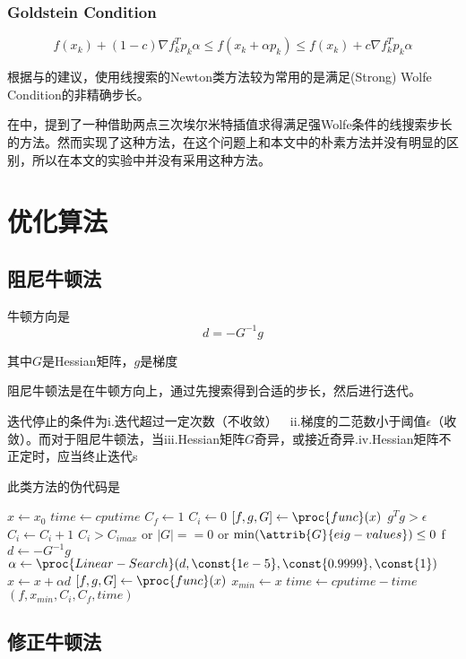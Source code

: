 \documentclass[11pt, a4paper]{article}
\begin{document}
\subsubsection{Goldstein Condition}
\[f(x_k)+(1-c)\nabla f_k^Tp_k\alpha \le f(x_k+\alpha p_k)\le f(x_k)+c\nabla f_k^T p_k\alpha\]


根据\cite{shanno1970conditioning}与\cite{ZHANG2001269}的建议，使用线搜索的Newton类方法较为常用的是满足(Strong) Wolfe Condition的非精确步长。

在\cite{Nocedal2006NO}中，提到了一种借助两点三次埃尔米特插值求得满足强Wolfe条件的线搜索步长的方法。然而\cite{ding2005investigation}实现了这种方法，在这个问题上和本文中的朴素方法并没有明显的区别，所以在本文的实验中并没有采用这种方法。

\section{优化算法}

\subsection{阻尼牛顿法}

牛顿方向是\[d=-G^{-1}g\]

其中$G$是Hessian矩阵，$g$是梯度

阻尼牛顿法是在牛顿方向上，通过先搜索得到合适的步长，然后进行迭代。

迭代停止的条件为i.迭代超过一定次数（不收敛）~~ii.梯度的二范数小于阈值$\epsilon$（收敛）。而对于阻尼牛顿法，当iii.Hessian矩阵$G$奇异，或接近奇异.iv.Hessian矩阵不正定时，应当终止迭代s

此类方法的伪代码是

\begin{codebox}
	\li $x\gets x_0$
	\li $time\gets cputime$
	\li $C_f\gets 1$
	\li $C_i\gets 0$
	\li $[f,g,G]\gets \proc{func}(x)$
	\li \While $g^Tg>\epsilon$ 
		\Do
	\li 	$C_i\gets C_i+1$
	\li 	\If $C_i>C_{imax}$ or $|G|==0$ or $\min (\attrib{G}{eig-values})\le0$
	\li			\Then \Return f
			\End
	\li		$d\gets -G^{-1}g$
	\li 	$\alpha\gets\proc{Linear-Search}(d,\const{1e-5},\const{0.9999},\const{1})$
	\li 	$x\gets x+\alpha d$
	\li 	$[f,g,G]\gets\proc{func}(x)$
		\End
	\li $x_{min}\gets x$
	\li $time\gets cputime-time$
	\li \Return $(f,x_{min},C_i,C_f,time)$
\end{codebox}

\subsection{修正牛顿法}
\end{document}
